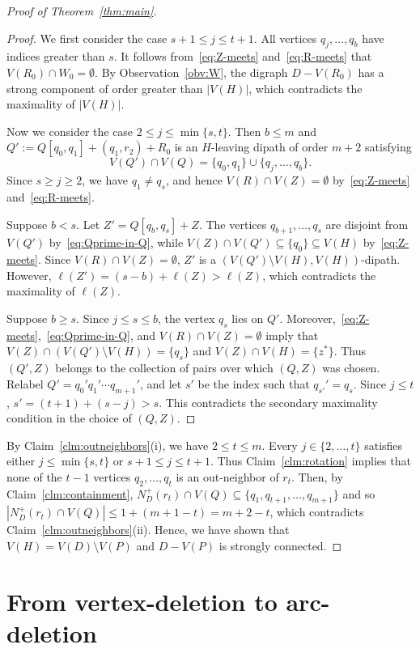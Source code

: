 \documentclass[12pt]{article}
\numberwithin{equation}{section}
\theoremstyle{plain}
\theoremstyle{definition}
\begin{document}
\begin{proof}[Proof of Theorem~\ref{thm:main}]
\begin{proof}
We first consider the case $s+1\le j\le t+1$.
All vertices $q_j,\ldots,q_b$ have indices greater than $s$.
It follows from~\eqref{eq:Z-meets} and~\eqref{eq:R-meets} that $V(R_0)\cap W_0=\emptyset$.
By Observation~\ref{obv:W}, the digraph $D-V(R_0)$ has a strong component of order greater than $|V(H)|$, which contradicts the maximality of $|V(H)|$.

Now we consider the case $2\le j\le\min\{s,t\}$.
Then $b\le m$ and $Q':=Q[q_0,q_1]+(q_1,r_2)+R_0$ is an $H$-leaving dipath of order $m+2$ satisfying
\begin{equation}\label{eq:Qprime-in-Q}
V(Q')\cap V(Q)=\{q_0,q_1\}\cup\{q_j,\ldots,q_b\}.
\end{equation}
Since $s\ge j\ge2$, we have $q_1\ne q_s$, and hence $V(R)\cap V(Z)=\emptyset$ by~\eqref{eq:Z-meets} and~\eqref{eq:R-meets}.

Suppose $b<s$.
Let $Z'=Q[q_b,q_s]+Z$.
The vertices $q_{b+1},\ldots,q_s$ are disjoint from $V(Q')$ by~\eqref{eq:Qprime-in-Q}, while $V(Z)\cap V(Q')\subseteq\{q_0\}\subseteq V(H)$ by~\eqref{eq:Z-meets}.
Since $V(R)\cap V(Z)=\emptyset$, $Z'$ is a $(V(Q')\setminus V(H),V(H))$-dipath.
However, $\ell(Z')=(s-b)+\ell(Z)>\ell(Z)$, which contradicts the maximality of $\ell(Z)$.

Suppose $b\ge s$.
Since $j\le s\le b$, the vertex $q_s$ lies on $Q'$.
Moreover,~\eqref{eq:Z-meets},~\eqref{eq:Qprime-in-Q}, and $V(R)\cap V(Z)=\emptyset$ imply that $V(Z)\cap(V(Q')\setminus V(H))=\{q_s\}$ and $V(Z)\cap V(H)=\{z^*\}$.
Thus $(Q',Z)$ belongs to the collection of pairs over which $(Q,Z)$ was chosen.
Relabel $Q'=q_0'q_1'\cdots q_{m+1}'$, and let $s'$ be the index such that $q_{s'}'=q_s$.
Since $j\le t$, $s'=(t+1)+(s-j)>s$.
This contradicts the secondary maximality condition in the choice of $(Q,Z)$.
\end{proof}

By Claim~\ref{clm:outneighbors}(i), we have $2\le t\le m$.
Every $j\in\{2,\ldots,t\}$ satisfies either $j\le\min\{s,t\}$ or $s+1\le j\le t+1$.
Thus Claim~\ref{clm:rotation} implies that none of the $t-1$ vertices $q_2,\ldots,q_t$ is an out-neighbor of $r_t$.
Then, by Claim~\ref{clm:containment}, $N_D^+(r_t)\cap V(Q)\subseteq \{q_1, q_{t+1}, \ldots, q_{m+1}\}$ and so $|N_D^+(r_t)\cap V(Q)|\le 1+(m+1-t)=m+2-t$, which contradicts Claim~\ref{clm:outneighbors}(ii).
Hence, we have shown that $V(H)=V(D)\setminus V(P)$ and $D-V(P)$ is strongly connected.
\end{proof}


\section{From vertex-deletion to arc-deletion}\label{sec:arc-deletion}
\end{document}
